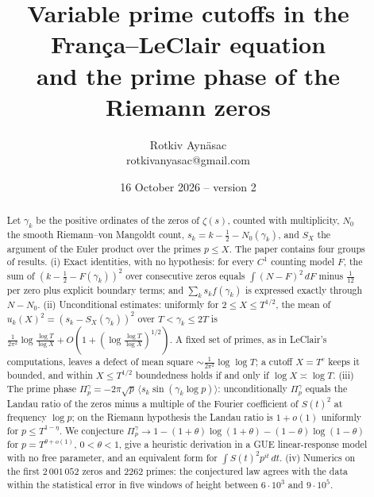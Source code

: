 \documentclass[11pt,reqno]{amsart}
\numberwithin{equation}{section}
\theoremstyle{plain}
\theoremstyle{definition}
\theoremstyle{remark}
\newcommand{\NO}{N_0}
\providecommand{\NoCaseChange}[1]{\lowercase{#1}}
\begin{document}
\title[Variable prime cutoffs and the prime phase of the zeros]{Variable prime cutoffs in the Fran\c{c}a--LeClair equation\\ and the prime phase of the Riemann zeros}
\author{Rotkiv Ayn\"asac\\[2pt]{\normalfont\NoCaseChange{ROTKIVANYASAC@GMAIL.COM}}}
\date{16 October 2026 -- version 2}

\begin{abstract}
Let $\gamma_k$ be the positive ordinates of the zeros of $\zeta(s)$, counted with multiplicity, $\NO$ the smooth Riemann--von Mangoldt count, $s_k=k-\frac12-\NO(\gamma_k)$, and $S_X$ the argument of the Euler product over the primes $p\le X$. The paper contains four groups of results.
(i) Exact identities, with no hypothesis: for every $C^1$ counting model $F$, the sum of $(k-\frac12-F(\gamma_k))^2$ over consecutive zeros equals $\int(N-F)^2\,dF$ minus $\frac1{12}$ per zero plus explicit boundary terms; and $\sum_k s_kf(\gamma_k)$ is expressed exactly through $N-\NO$.
(ii) Unconditional estimates: uniformly for $2\le X\le T^{1/2}$, the mean of $u_k(X)^2=(s_k-S_X(\gamma_k))^2$ over $T<\gamma_k\le2T$ is $\frac1{2\pi^2}\log\frac{\log T}{\log X}+O(1+(\log\frac{\log T}{\log X})^{1/2})$. A fixed set of primes, as in LeClair's computations, leaves a defect of mean square $\sim\frac1{2\pi^2}\log\log T$; a cutoff $X=T^c$ keeps it bounded, and within $X\le T^{1/2}$ boundedness holds if and only if $\log X\asymp\log T$.
(iii) The prime phase $\Pi^\gamma_p=-2\pi\sqrt p\,\langle s_k\sin(\gamma_k\log p)\rangle$: unconditionally $\Pi^\gamma_p$ equals the Landau ratio of the zeros minus a multiple of the Fourier coefficient of $S(t)^2$ at frequency $\log p$; on the Riemann hypothesis the Landau ratio is $1+o(1)$ uniformly for $p\le T^{1-\eta}$. We conjecture $\Pi^\gamma_p\to1-(1+\theta)\log(1+\theta)-(1-\theta)\log(1-\theta)$ for $p=T^{\theta+o(1)}$, $0<\theta<1$, give a heuristic derivation in a GUE linear-response model with no free parameter, and an equivalent form for $\int S(t)^2p^{it}\,dt$.
(iv) Numerics on the first $2\,001\,052$ zeros and $2262$ primes: the conjectured law agrees with the data within the statistical error in five windows of height between $6\cdot10^3$ and $9\cdot10^5$.
\end{abstract}

\maketitle
{}
\end{document}
